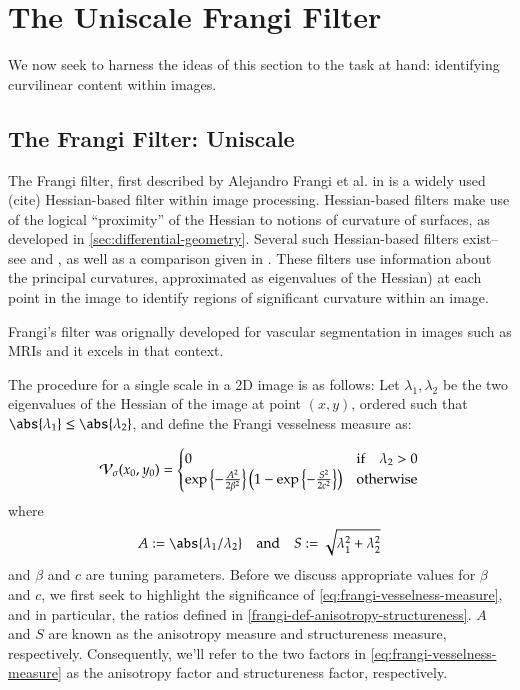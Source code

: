 \chapter{The Uniscale Frangi Filter}

	We now seek to harness the ideas of this section to the task at hand: identifying curvilinear content within images.
\section{The Frangi Filter: Uniscale} \label{sec:frangi}

The Frangi filter, first described by Alejandro Frangi et al. in \cite{frangi-paper} is a widely used (cite) Hessian-based filter
within image processing. Hessian-based filters make use of the
logical ``proximity'' of the Hessian to notions of curvature of surfaces,
as developed in \cref{sec:differential-geometry}. 
Several such Hessian-based filters exist--see \cite{sato-filter} and \cite{lorenz-filter}, as well as a comparison given in \cite{olabarriaga-hessian-comparison}. These filters use information about the principal curvatures, approximated as eigenvalues of the Hessian) at each point in the image
to identify regions of significant curvature within an image.


Frangi's filter was orignally developed for vascular segmentation in images such as MRIs and it excels in that context.

The procedure for a single scale in a 2D image is as follows:
Let $\lambda_1, \lambda_2$ be the two eigenvalues of the Hessian of the image at point $(x, y)$,
ordered such that $\abs{\lambda_1} \leq \abs{\lambda_2}$, and define the Frangi vesselness measure %
as:

\begin{equation} \label{eq:frangi-vesselness-measure}
\mathcal{V}_{\sigma}(x_0,y_0) = \begin{cases}
0 & \text{if} \quad \lambda_2 > 0 \\
\exp\left\{-\frac{A^2}{2\beta^2}\right\}
\left(1 - \exp\left\{-\frac{S^2}{2c^2}\right\}\right) & \text{otherwise}
\end{cases} \end{equation}
where
\begin{equation} \label{frangi-def-anisotropy-structureness}
A := \abs{\lambda_1 / \lambda_2}
\quad \textrm{and} \quad 
S := \sqrt{\lambda_1^2 + \lambda_2^2}
\end{equation}
and $\beta$ and $c$ are tuning parameters. Before we discuss appropriate values for $\beta$ and $c$, we first seek to highlight the significance of \cref{eq:frangi-vesselness-measure}, and in particular, the ratios defined in
\cref{frangi-def-anisotropy-structureness}. $A$ and $S$ are known as the anisotropy measure and structureness measure, respectively. Consequently, we'll refer to the two factors in \cref{eq:frangi-vesselness-measure} as the anisotropy factor and structureness factor, respectively. 


